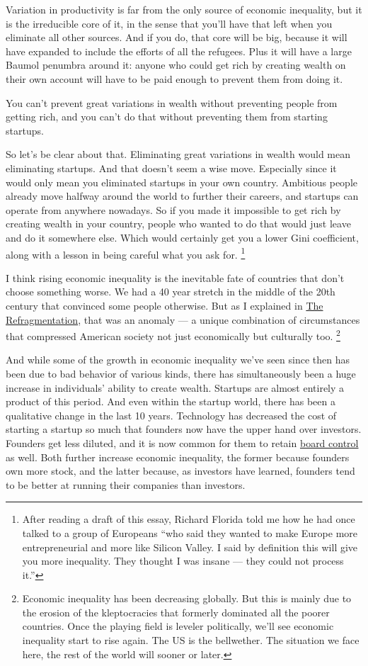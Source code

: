 \documentclass[12pt]{book}
\begin{document}
Variation in productivity is far from the only source of economic
inequality, but it is the irreducible core of it, in the sense that
you'll have that left when you eliminate all other sources. And if you
do, that core will be big, because it will have expanded to include the
efforts of all the refugees. Plus it will have a large Baumol penumbra
around it: anyone who could get rich by creating wealth on their own
account will have to be paid enough to prevent them from doing it.

You can't prevent great variations in wealth without preventing people
from getting rich, and you can't do that without preventing them from
starting startups.

So let's be clear about that. Eliminating great variations in wealth
would mean eliminating startups. And that doesn't seem a wise move.
Especially since it would only mean you eliminated startups in your own
country. Ambitious people already move halfway around the world to
further their careers, and startups can operate from anywhere nowadays.
So if you made it impossible to get rich by creating wealth in your
country, people who wanted to do that would just leave and do it
somewhere else. Which would certainly get you a lower Gini coefficient,
along with a lesson in being careful what you ask for.
\footnote{After reading a draft of this essay, Richard Florida told me how
he had once talked to a group of Europeans ``who said they wanted to
make Europe more entrepreneurial and more like Silicon Valley. I said by
definition this will give you more inequality. They thought I was insane
--- they could not process it.''}

I think rising economic inequality is the inevitable fate of countries
that don't choose something worse. We had a 40 year stretch in the
middle of the 20th century that convinced some people otherwise. But as
I explained in \href{re.html}{The Refragmentation}, that was an anomaly
--- a unique combination of circumstances that compressed American
society not just economically but culturally too.
\footnote{Economic inequality has been decreasing globally. But this is
mainly due to the erosion of the kleptocracies that formerly dominated
all the poorer countries. Once the playing field is leveler politically,
we'll see economic inequality start to rise again. The US is the
bellwether. The situation we face here, the rest of the world will
sooner or later.}

And while some of the growth in economic inequality we've seen since
then has been due to bad behavior of various kinds, there has
simultaneously been a huge increase in individuals' ability to create
wealth. Startups are almost entirely a product of this period. And even
within the startup world, there has been a qualitative change in the
last 10 years. Technology has decreased the cost of starting a startup
so much that founders now have the upper hand over investors. Founders
get less diluted, and it is now common for them to retain
\href{control.html}{board control} as well. Both further increase
economic inequality, the former because founders own more stock, and the
latter because, as investors have learned, founders tend to be better at
running their companies than investors.
\end{document}

